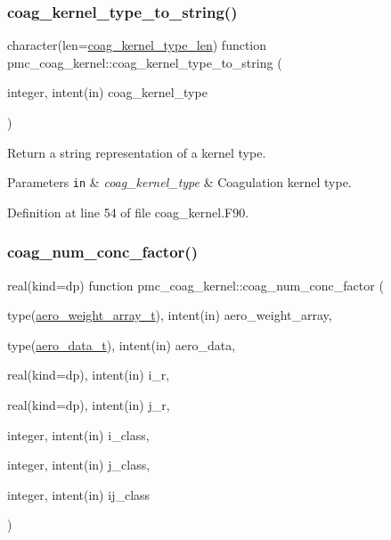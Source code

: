 \subsubsection{\texorpdfstring{coag\+\_\+kernel\+\_\+type\+\_\+to\+\_\+string()}{coag\_kernel\_type\_to\_string()}}
{\footnotesize\ttfamily character(len=\mbox{\hyperlink{namespacepmc__coag__kernel_a5b9c2196146dafb206c5442d2c928559}{coag\+\_\+kernel\+\_\+type\+\_\+len}}) function pmc\+\_\+coag\+\_\+kernel\+::coag\+\_\+kernel\+\_\+type\+\_\+to\+\_\+string (\begin{DoxyParamCaption}\item[{integer, intent(in)}]{coag\+\_\+kernel\+\_\+type }\end{DoxyParamCaption})}



Return a string representation of a kernel type. 


\begin{DoxyParams}[1]{Parameters}
\mbox{\tt in}  & {\em coag\+\_\+kernel\+\_\+type} & Coagulation kernel type. \\
\hline
\end{DoxyParams}


Definition at line 54 of file coag\+\_\+kernel.\+F90.

\mbox{\label{namespacepmc__coag__kernel_a39c314a4ab6418c6c6ff1fc12678de26}} 
\subsubsection{\texorpdfstring{coag\+\_\+num\+\_\+conc\+\_\+factor()}{coag\_num\_conc\_factor()}}
{\footnotesize\ttfamily real(kind=dp) function pmc\+\_\+coag\+\_\+kernel\+::coag\+\_\+num\+\_\+conc\+\_\+factor (\begin{DoxyParamCaption}\item[{type(\mbox{\hyperlink{structpmc__aero__weight__array_1_1aero__weight__array__t}{aero\+\_\+weight\+\_\+array\+\_\+t}}), intent(in)}]{aero\+\_\+weight\+\_\+array,  }\item[{type(\mbox{\hyperlink{structpmc__aero__data_1_1aero__data__t}{aero\+\_\+data\+\_\+t}}), intent(in)}]{aero\+\_\+data,  }\item[{real(kind=dp), intent(in)}]{i\+\_\+r,  }\item[{real(kind=dp), intent(in)}]{j\+\_\+r,  }\item[{integer, intent(in)}]{i\+\_\+class,  }\item[{integer, intent(in)}]{j\+\_\+class,  }\item[{integer, intent(in)}]{ij\+\_\+class }\end{DoxyParamCaption})}



